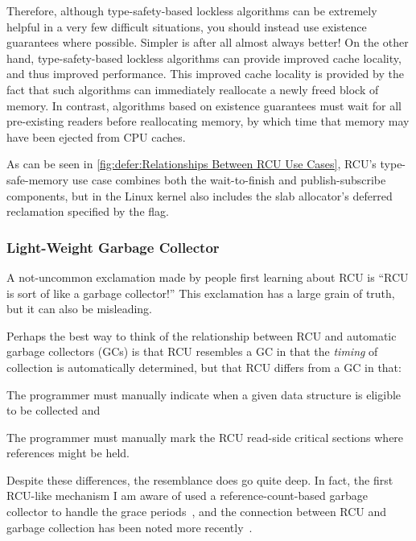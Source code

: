 Therefore, although type-safety-based lockless algorithms can be extremely
helpful in a very few difficult situations, you should instead use existence
guarantees where possible.
Simpler is after all almost always better!
On the other hand, type-safety-based lockless algorithms can
provide improved cache locality, and thus improved performance.
This improved cache locality is provided by the fact that such
algorithms can immediately reallocate a newly freed block of memory.
In contrast, algorithms based on existence guarantees must wait for
all pre-existing readers before reallocating memory, by which time
that memory may have been ejected from CPU caches.

As can be seen in \cref{fig:defer:Relationships Between RCU Use Cases},
RCU's type-safe-memory use case combines both the wait-to-finish
and publish-subscribe components, but in the Linux kernel also includes
the slab allocator's deferred reclamation specified by the
 flag.

\subsubsection{Light-Weight Garbage Collector}
\label{sec:defer:Light-Weight Garbage Collector}

A not-uncommon exclamation made by people first learning about
RCU is ``RCU is sort of like a garbage collector!''
This exclamation has a large grain of truth, but it can also be
misleading.

Perhaps the best way to think of the relationship between RCU
and automatic garbage collectors (GCs) is that RCU resembles
a GC in that the \emph{timing} of collection is automatically
determined, but that RCU differs from a GC in that:
\begin{enumerate*}[(1)]
\item The programmer must manually indicate when a given data
structure is eligible to be collected and
\item The programmer must manually mark the RCU read-side critical
sections where references might be held.
\end{enumerate*}

Despite these differences, the resemblance does go quite deep.
In fact, the first RCU-like mechanism I am aware of used a
reference-count-based garbage collector to handle the grace
periods~\cite{Kung80}, and the connection between RCU and
garbage collection has been noted more
recently~\cite{HarshalSheth2016goRCU}.


